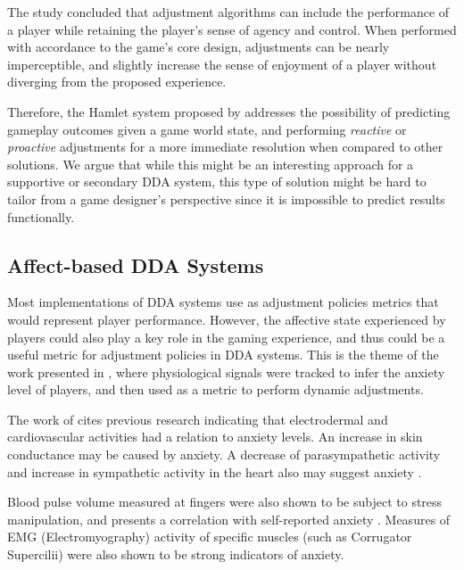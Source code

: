 The study concluded that adjustment algorithms can include the performance of a player while retaining the player's sense of agency and control. When performed with accordance to the game's core design, adjustments can be nearly imperceptible, and slightly increase the sense of enjoyment of a player without diverging from the proposed experience.

Therefore, the Hamlet system proposed by \citet{article_casefordynamicdifficulty} addresses the possibility of predicting gameplay outcomes given a game world state, and performing \emph{reactive} or \emph{proactive} adjustments for a more immediate resolution when compared to other solutions. We argue that while this might be an interesting approach for a supportive or secondary DDA system, this type of solution might be hard to tailor from a game designer's perspective since it is impossible to predict results functionally.


\subsection{Affect-based DDA Systems}

Most implementations of DDA systems use as adjustment policies metrics that would represent player performance. However, the affective state experienced by players could also play a key role in the gaming experience, and thus could be a useful metric for adjustment policies in DDA systems. This is the theme of the work presented in \cite{article_affectivedda}, where physiological signals were tracked to infer the anxiety level of players, and then used as a metric to perform dynamic adjustments.

The work of \citet{article_affectivedda} cites previous research indicating that electrodermal and cardiovascular activities had a relation to anxiety levels. An increase in skin conductance may be caused by anxiety. A decrease of parasympathetic activity and increase in sympathetic activity in the heart also may suggest anxiety \cite{article_affectivedda}.

Blood pulse volume measured at fingers were also shown to be subject to stress manipulation, and presents a correlation with self-reported anxiety \cite{article_affectivedda}. Measures of EMG (Electromyography) activity of specific muscles (such as Corrugator Supercilii) were also shown to be strong indicators of anxiety.

